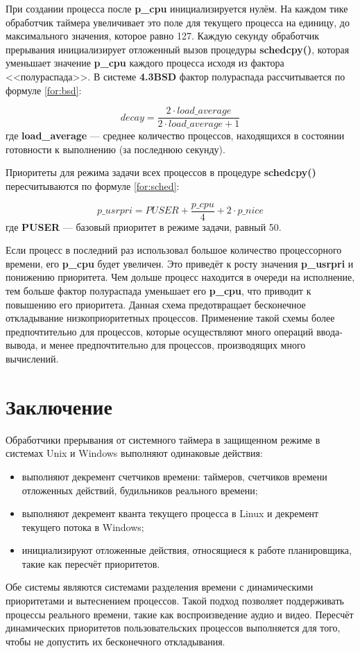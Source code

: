 \documentclass[a4paper,14pt]{extarticle}
\begin{document}
При создании процесса после \textbf{p\_cpu} инициализируется нулём. На каждом тике обработчик таймера увеличивает это поле для текущего 
процесса на единицу, до максимального значения, которое равно 127. Каждую секунду обработчик прерывания инициализирует отложенный вызов 
процедуры \textbf{schedcpy()}, которая уменьшает значение \textbf{p\_cpu} каждого процесса исходя из фактора <<полураспада>>. В системе 
\textbf{4.3BSD} фактор полураспада рассчитывается по формуле \eqref{for:bsd}: 

\begin{equation}
    \label{for:bsd}
    decay = \frac{2 \cdot load\_average}{2 \cdot load\_average + 1}
\end{equation}
где \textbf{load\_average} --- среднее количество процессов, находящихся в состоянии готовности к выполнению (за последнюю секунду).

Приоритеты для режима задачи всех процессов в процедуре \textbf{schedcpy()} пересчитываются по формуле \eqref{for:sched}:

\begin{equation}
    \label{for:sched}
    p\_usrpri = PUSER + \frac{p\_cpu}{4} + 2 \cdot p\_nice
\end{equation}
где \textbf{PUSER} --- базовый приоритет в режиме задачи, равный 50.

Если процесс в последний раз использовал большое количество процессорного времени, его \textbf{p\_cpu} будет увеличен. Это приведёт к 
росту значения \textbf{p\_usrpri} и понижению приоритета. Чем дольше процесс находится в очереди на исполнение, тем больше 
фактор полураспада уменьшает его \textbf{p\_cpu}, что приводит к повышению его приоритета. Данная схема предотвращает бесконечное откладывание 
низкоприоритетных процессов. Применение такой схемы более предпочтительно для процессов, которые осуществляют много 
операций ввода-вывода, и менее предпочтительно для процессов, производящих много вычислений.

\section*{Заключение}
Обработчики прерывания от системного таймера в защищенном режиме в системах Unix и Windows выполняют одинаковые действия:

\begin{itemize} 
	\item выполняют декремент счетчиков времени: таймеров, счетчиков времени отложенных действий, будильников реального времени;
	\item выполняют декремент кванта текущего процесса в Linux и декремент текущего потока в Windows;
	\item инициализируют отложенные действия, относящиеся к работе планировщика, такие как пересчёт приоритетов.
\end{itemize} 

Обе системы являются системами разделения времени с динамическими приоритетами и вытеснением процессов. Такой подход позволяет 
поддерживать процессы реального времени, такие как воспроизведение аудио и видео. Пересчёт динамических приоритетов пользовательских 
процессов выполняется для того, чтобы не допустить их бесконечного откладывания.
\end{document}
